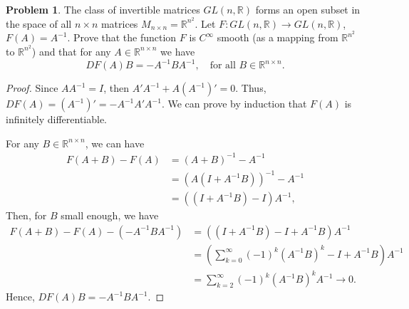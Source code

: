 \documentclass[11pt]{article}
\theoremstyle{definition}
\newtheorem{problem}{Problem}
\theoremstyle{definition}
\begin{document}
\begin{problem}\label{problem_49}
The class of invertible matrices
$GL(n,\mathbb{R})$ forms an open subset in the space of all $n\times n$ matrices $M_{n\times n}=\mathbb{R}^{n^2}$.
Let $F:GL(n,\mathbb{R})\to GL(n,\mathbb{R})$, $F(A)=A^{-1}$.
Prove that the function $F$ is $C^\infty$ smooth (as a mapping from $\mathbb{R}^{n^2}$ to $\mathbb{R}^{n^2}$) and that
for any $A\in\mathbb{R}^{n\times n}$ we have
$$
DF(A)B=-A^{-1} B A^{-1},
\quad \text{for all $B\in \mathbb{R}^{n\times n}$}.
$$
\end{problem}
\begin{proof}
Since $AA^{-1} = I$, then $A' A^{-1} + A \left(A^{-1}\right)' = 0$. Thus, $DF(A) = \left(A^{-1}\right)' = - A^{-1} A' A^{-1}$. We can prove by induction that $F(A)$ is infinitely differentiable.

For any $B \in \mathbb{R}^{n\times n}$, we can have 
\begin{align*}
    F(A+B) - F(A) & = \left(A+B\right)^{-1} - A^{-1} \\
    & = \left(A \left(I+A^{-1}B \right) \right)^{-1} - A^{-1} \\
    & = \left(\left(I+A^{-1}B \right) - I \right) A^{-1},
\end{align*}
Then, for $B$ small enough, we have
\begin{align*}
    F(A+B) - F(A) - \left(- A^{-1} B A^{-1}\right) & = \left(\left(I+A^{-1}B \right) - I + A^{-1} B\right) A^{-1} \\
    & = \left(\sum^\infty_{k=0}(-1)^k \left(A^{-1}B\right)^k  - I + A^{-1} B\right) A^{-1} \\
    & = \sum^\infty_{k=2}(-1)^k \left(A^{-1}B\right)^k A^{-1} \to 0.
\end{align*}
Hence, $DF(A)B = -A^{-1} B A^{-1}$.
\end{proof}

\medskip
\end{document}
